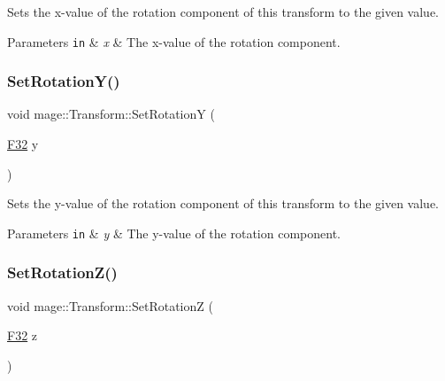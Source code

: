 Sets the x-\/value of the rotation component of this transform to the given value.


\begin{DoxyParams}[1]{Parameters}
\mbox{\tt in}  & {\em x} & The x-\/value of the rotation component. \\
\hline
\end{DoxyParams}
\mbox{\label{classmage_1_1_transform_aaf2754a227e2cf416960a92f7e4c5dc7}} 
\subsubsection{\texorpdfstring{Set\+Rotation\+Y()}{SetRotationY()}}
{\footnotesize\ttfamily void mage\+::\+Transform\+::\+Set\+RotationY (\begin{DoxyParamCaption}\item[{\mbox{\hyperlink{namespacemage_aa97e833b45f06d60a0a9c4fc22ae02c0}{F32}}}]{y }\end{DoxyParamCaption})\hspace{0.3cm}{\ttfamily [noexcept]}}

Sets the y-\/value of the rotation component of this transform to the given value.


\begin{DoxyParams}[1]{Parameters}
\mbox{\tt in}  & {\em y} & The y-\/value of the rotation component. \\
\hline
\end{DoxyParams}
\mbox{\label{classmage_1_1_transform_aca5e1d7c83e91f9c36be98c4a4a2163b}} 
\subsubsection{\texorpdfstring{Set\+Rotation\+Z()}{SetRotationZ()}}
{\footnotesize\ttfamily void mage\+::\+Transform\+::\+Set\+RotationZ (\begin{DoxyParamCaption}\item[{\mbox{\hyperlink{namespacemage_aa97e833b45f06d60a0a9c4fc22ae02c0}{F32}}}]{z }\end{DoxyParamCaption})\hspace{0.3cm}{\ttfamily [noexcept]}}

